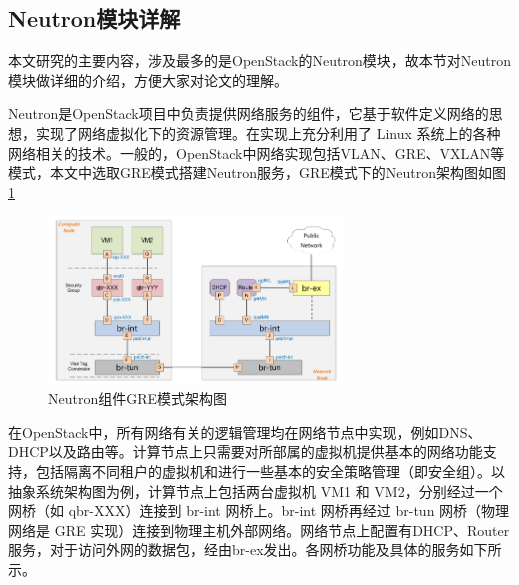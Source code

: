 \subsection{Neutron模块详解}
本文研究的主要内容，涉及最多的是OpenStack的Neutron模块，故本节对Neutron模块做详细的介绍，方便大家对论文的理解。

Neutron是OpenStack项目中负责提供网络服务的组件，它基于软件定义网络的思想，实现了网络虚拟化下的资源管理。在实现上充分利用了 Linux 系统上的各种网络相关的技术。一般的，OpenStack中网络实现包括VLAN、GRE、VXLAN等模式，本文中选取GRE模式搭建Neutron服务，GRE模式下的Neutron架构图如图\ref{fig:neutron}

\begin{figure}[!htb]
  \centering
  \includegraphics[width=0.7\textwidth]{logo/neutron.png}
  \caption{Neutron组件GRE模式架构图}
  \label{fig:neutron}
\end{figure}

在OpenStack中，所有网络有关的逻辑管理均在网络节点中实现，例如DNS、DHCP以及路由等。计算节点上只需要对所部属的虚拟机提供基本的网络功能支持，包括隔离不同租户的虚拟机和进行一些基本的安全策略管理（即安全组）。以抽象系统架构图为例，计算节点上包括两台虚拟机 VM1 和 VM2，分别经过一个网桥（如 qbr-XXX）连接到 br-int 网桥上。br-int 网桥再经过 br-tun 网桥（物理网络是 GRE 实现）连接到物理主机外部网络。网络节点上配置有DHCP、Router服务，对于访问外网的数据包，经由br-ex发出。各网桥功能及具体的服务如下所示。

